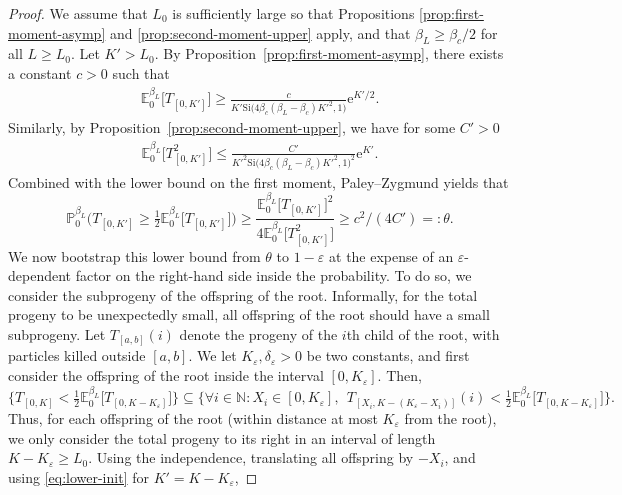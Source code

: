 \documentclass[a4paper, a4wide, 10pt, reqno]{amsart}
\theoremstyle{plain}
\theoremstyle{definition}
\numberwithin{equation}{section}
\newcommand{\N}{{\mathbb N}}
\newcommand{\E}{\mathbb E}
\newcommand{\Prob}{\mathbb{P}}
\newcommand{\re}{{\mathrm e}}
\newcommand{\Si}{{\mathrm{Si}}}
\begin{document}
\begin{proof} 
    We assume that $L_0$ is sufficiently large so that Propositions \ref{prop:first-moment-asymp} and \ref{prop:second-moment-upper} apply, and that $\beta_L\ge \beta_c/2$ for all $L\ge L_0$. Let $K'>L_0$.
        By Proposition~\ref{prop:first-moment-asymp}, there exists a constant $c>0$ such that 
        \[
        \begin{aligned}
    \E_0^{\beta_L}\big[T_{[0, K']}\big] \ge \frac{c}{K'\Si\big(4\beta_c(\beta_L-\beta_c){K'}^2, 1\big)}\re^{K'/2}.
    \end{aligned}
    \]
    Similarly, by Proposition~\ref{prop:second-moment-upper}, we have for some $C'>0$
        \[
        \begin{aligned}
        \E_0^{\beta_L}\big[T_{[0, K']}^2\big]\le \frac{C'}{{K'}^2\Si\big(4\beta_c(\beta_L-\beta_c){K'}^2, 1\big)^2}\re^{ K'}.
        \end{aligned}
        \]
    Combined with the lower bound on the first moment, Paley--Zygmund yields that 
    \begin{equation}\label{eq:lower-init}
    \Prob^{\beta_L}_0\Big(T_{[0, K']}\ge \tfrac{1}{2}\E^{\beta_L}_0\big[T_{[0, K']}\big]\Big)\ge\frac{\E^{\beta_L}_0\big[T_{[0,K']}\big]^2}{4\E^{\beta_L}_0\big[T_{[0,K']}^2\big]}\ge c^2/(4C')=:\theta.
    \end{equation} 
    We now bootstrap this lower bound from $\theta$ to $1-\varepsilon$ at the expense of an $\varepsilon$-dependent factor on the right-hand side inside the probability. To do so, we consider the subprogeny of the offspring of the root. Informally, for the total progeny to be unexpectedly small, all offspring of the root should have a small subprogeny. Let $T_{[a,b]}(i)$ denote the progeny of the $i$th child of the root, with particles killed outside $[a,b]$. We let $K_\varepsilon, \delta_\varepsilon>0$ be two constants, and first consider the offspring of the root inside the interval $[0, K_\varepsilon]$.  
    Then, 
    \[
    \Big\{T_{[0, K]} < \tfrac{1}{2}\E_{0}^{\beta_L}\big[T_{[0, K-K_\varepsilon]}\big]\Big\}\subseteq\Big\{\forall i \in\N: X_i\in[0, K_\varepsilon],\ \ T_{[X_i, K-(K_\varepsilon - X_i)]}(i) < \tfrac{1}{2}\E_{0}^{\beta_L}\big[T_{[0, K-K_\varepsilon]}\big]\Big\}.
    \]
    Thus, for each offspring of the root (within distance at most $K_\varepsilon$ from the root), we only consider the total progeny to its right in an interval of length $K-K_\varepsilon\ge L_0$. 
    Using the independence, translating all offspring by $-X_i$, and using \eqref{eq:lower-init} for $K'=K-K_\varepsilon$,

\end{proof}
\end{document}
